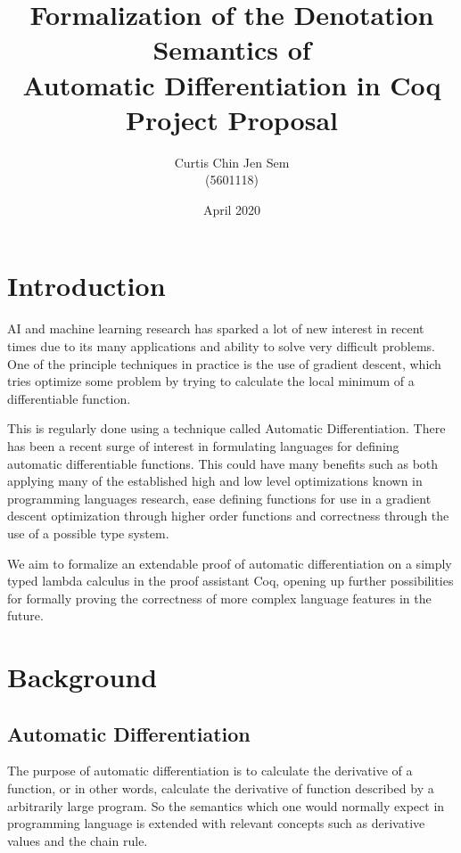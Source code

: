 \documentclass[11pt, letterpaper]{article}
\title{Formalization of the Denotation Semantics of
    \\ Automatic Differentiation in Coq
    \\ Project Proposal
}
\author{Curtis Chin Jen Sem \\ (5601118)}
\date{April 2020}
\begin{document}
\maketitle

\section{Introduction}

AI and machine learning research has sparked a lot of new interest in recent times due to its many applications and ability to solve very difficult problems. One of the principle techniques in practice is the use of gradient descent, which tries optimize some problem by trying to calculate the local minimum of a differentiable function.

This is regularly done using a technique called Automatic Differentiation. There has been a recent surge of interest in formulating languages for defining automatic differentiable functions. This could have many benefits such as both applying many of the established high and low level optimizations known in programming languages research, ease defining functions for use in a gradient descent optimization through higher order functions and correctness through the use of a possible type system.

We aim to formalize an extendable proof of automatic differentiation on a simply typed lambda calculus in the proof assistant Coq, opening up further possibilities for formally proving the correctness of more complex language features in the future.


\section{Background}

\subsection{Automatic Differentiation}


The purpose of automatic differentiation is to calculate the derivative of a function, or in other words, calculate the derivative of function described by a arbitrarily large program. So the semantics which one would normally expect in programming language is extended with relevant concepts such as derivative values and the chain rule.
\end{document}
